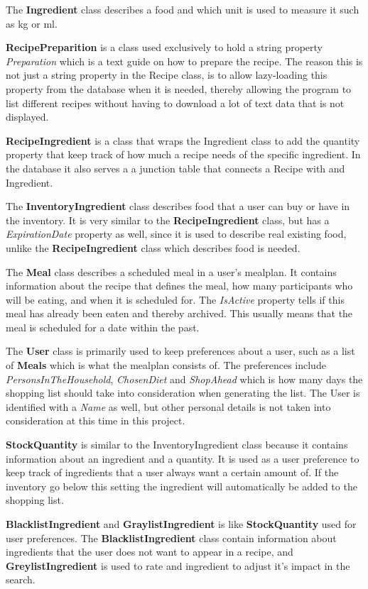The \textbf{Ingredient} class describes a food and which unit is used to measure it such as kg or ml.

\textbf{RecipePreparition} is a class used exclusively to hold a string property \textit{Preparation} which is a text guide on how to prepare the recipe. The reason this is not just a string property in the Recipe class, is to allow lazy-loading this property from the database when it is needed, thereby allowing the program to list different recipes without having to download a lot of text data that is not displayed.

\textbf{RecipeIngredient} is a class that wraps the Ingredient class to add the quantity property that keep track of how much a recipe needs of the specific ingredient. In the database it also serves a a junction table that connects a Recipe with and Ingredient.

The \textbf{InventoryIngredient} class describes food that a user can buy or have in the inventory. It is very similar to the \textbf{RecipeIngredient} class, but has a \textit{ExpirationDate} property as well, since it is used to describe real existing food, unlike the \textbf{RecipeIngredient} class which describes food is needed.

The \textbf{Meal} class describes a scheduled meal in a user's mealplan. It contains information about the recipe that defines the meal, how many participants who will be eating, and when it is scheduled for. The \textit{IsActive} property tells if this meal has already been eaten and thereby archived. This usually means that the meal is scheduled for a date within the past.

The \textbf{User} class is primarily used to keep preferences about a user, such as a list of \textbf{Meals} which is what the mealplan consists of. The preferences include \textit{PersonsInTheHousehold}, \textit{ChosenDiet} and \textit{ShopAhead} which is how many days the shopping list should take into consideration when generating the list. The User is identified with a \textit{Name} as well, but other personal details is not taken into consideration at this time in this project.

\textbf{StockQuantity} is similar to the InventoryIngredient class because it contains information about an ingredient and a quantity. It is used as a user preference to keep track of ingredients that a user always want a certain amount of. If the inventory go below this setting the ingredient will automatically be added to the shopping list.

\textbf{BlacklistIngredient} and \textbf{GraylistIngredient} is like \textbf{StockQuantity} used for user preferences. The \textbf{BlacklistIngredient} class contain information about ingredients that the user does not want to appear in a recipe, and \textbf{GreylistIngredient} is used to rate and ingredient to adjust it's impact in the search.


